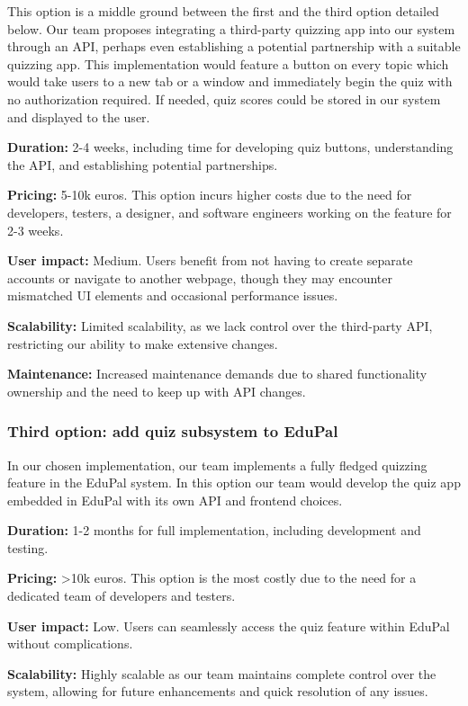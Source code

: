 \documentclass[
    english, %
]{VUMIFPSkursinis}
\begin{document}
This option is a middle ground between the first and the third option detailed below. Our team proposes integrating a third-party quizzing app into our system through an API, perhaps even establishing a potential partnership with a suitable quizzing app. This implementation would feature a button on every topic which would take users to a new tab or a window and immediately begin the quiz with no authorization required. If needed, quiz scores could be stored in our system and displayed to the user.

\textbf{Duration:} 2-4 weeks, including time for developing quiz buttons, understanding the API, and establishing potential partnerships.

\textbf{Pricing:} 5-10k euros. This option incurs higher costs due to the need for developers, testers, a designer, and software engineers working on the feature for 2-3 weeks.

\textbf{User impact:} Medium. Users benefit from not having to create separate accounts or navigate to another webpage, though they may encounter mismatched UI elements and occasional performance issues.

\textbf{Scalability:} Limited scalability, as we lack control over the third-party API, restricting our ability to make extensive changes.

\textbf{Maintenance:} Increased maintenance demands due to shared functionality ownership and the need to keep up with API changes.

\subsubsection{Third option: add quiz subsystem to EduPal}

In our chosen implementation, our team implements a fully fledged quizzing feature in the EduPal system. In this option our team would develop the quiz app embedded in EduPal with its own API and frontend choices.

\textbf{Duration:} 1-2 months for full implementation, including development and testing.

\textbf{Pricing:} >10k euros. This option is the most costly due to the need for a dedicated team of developers and testers.

\textbf{User impact:} Low. Users can seamlessly access the quiz feature within EduPal without complications.

\textbf{Scalability:} Highly scalable as our team maintains complete control over the system, allowing for future enhancements and quick resolution of any issues.
\end{document}
